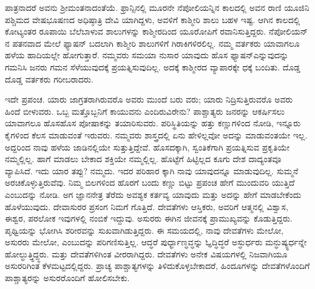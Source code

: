 ಪಾತ್ರನಾದರೆ ಅವನು ಶ‍್ರೀಮಂತನಾದಂತೆಯೆ. ಫ್ರಾನ್ಸಿನಲ್ಲಿ ಮೂರನೇ ನೆಪೋಲಿಯನ್ನಿನ ಕಾಲದಲ್ಲಿ ಅವನ ರಾಣಿ ಯೂಜಿನಿ ಪಶ್ಚಿಮದ ವೇಷಭೂಷಣದ ಅಧಿಷ್ಠಾತ್ರಿ ದೇವಿ ಯಾಗಿದ್ದಳು, ಅವಳಿಗೆ ಕಾಶ್ಮೀರಿ ಶಾಲು ಬಹಳ ಇಷ್ಟ. ಆಗಿನ ಕಾಲದಲ್ಲಿ ಕೋಟ್ಯಂತರ ರೂಪಾಯಿ ಬೆಲೆಬಾಳುವ ಶಾಲುಗಳನ್ನು ಕಾಶ್ಮೀರದಿಂದ ಯೂರೋಪಿಗೆ ರವಾನಿಸುತ್ತಿದ್ದರು. ನೆಪೋಲಿಯನ್​ನ ಪತನವಾದ ಮೇಲೆ ಫ್ಯಾಷನ್​ ಬದಲಾಗಿ ಕಾಶ್ಮೀರಿ ಶಾಲುಗಳಿಗೆ ಗಿರಾಕಿಗಳಿರಲಿಲ್ಲ. ನಮ್ಮ ವರ್ತಕರು ಯಾವಾಗಲೂ ಹಳೆಯ ಹಾದಿಯಲ್ಲೇ ಹೋಗುತ್ತಾರೆ. ನಮ್ಮವರು ಸಮಯಾ ನುಸಾರ ಯಾವುದು ಹೊಸ ಫ್ಯಾಷನ್​ ಎನ್ನುವುದನ್ನು ಗಮನಿಸಿ ಜನರು ಗಮನ ಸೆಳೆಯುವುದಕ್ಕೆ ಪ್ರಯತ್ನಿಸುವುದಿಲ್ಲ. ಅದಕ್ಕೆ ಕಾಶ್ಮೀರದ ವ್ಯಾಪಾರಕ್ಕೇ ಧಕ್ಕೆ ಬಂದಿತು. ದೊಡ್ಡ ದೊಡ್ಡ ವರ್ತಕರು ಗರೀಬರಾದರು.

ಇದೇ ಪ್ರಪಂಚ. ಯಾರು ಜಾಗ್ರತರಾಗಿರುವರೊ ಅವರು ಮುಂದೆ ಬರು ವರು; ಯಾರು ನಿದ್ರಿಸುತ್ತಿರುವರೊ ಅವರು ಹಿಂದೆ ಬೀಳುವರು. ಒಬ್ಬ ಮತ್ತೊಬ್ಬನಿಗೆ ಕಾಯುವನು ಎಂದಿರುವಿರೇನು? ಪಾಶ್ಚಾತ್ಯರು ಜನರನ್ನು ಆಕರ್ಷಿಸಲು ಯಾವಾಗಲೂ ಹೊಸಹೊಸ ಪೋಷಾಕನ್ನು ತಯಾರಿಸುವರು. ಪರಿಸ್ಥಿತಿಯನ್ನು ಹತ್ತು ಕಣ್ಣುಗಳಿಂದ ನೋಡಿ, ಇನ್ನೂರು ಕೈಗಳಿಂದ ಕೆಲಸ ಮಾಡುವಂತೆ ಇರುವರು. ನಮ್ಮವರು ಶಾಸ್ತ್ರದಲ್ಲಿ ಏನು ಹೇಳಿಲ್ಲವೋ ಅದನ್ನು ಮಾಡುವಂತಯೇ ಇಲ್ಲ. ಅದ್ದರಿಂದ ನಾವು ಹಳೆಯ ಜಾಡಿನಲ್ಲಿಯೇ ಸುತ್ತುತ್ತಿದ್ದೇವೆ. ಹೊಸದಕ್ಕಾಗಿ, ಸ್ವಂತಿಕೆಗಾಗಿ ಪ್ರಯತ್ನಿಸುವ ಪ್ರಕೃತಿಯೇ ನಮ್ಮಲ್ಲಿಲ್ಲ. ಹಾಗೆ ಮಾಡಲು ಬೇಕಾದ ಶಕ್ತಿಯೇ ನಮ್ಮಲ್ಲಿಲ್ಲ. ಹೊಟ್ಟೆಗೆ ಹಿಟ್ಟಿಲ್ಲದ ಕೂಗು ದೇಶ ದಾದ್ಯಂತವೂ ವ್ಯಾಪಿಸಿದೆ. ಇದು ಯಾರ ತಪ್ಪು? ನಮ್ಮದು. ಇದರ ಪರಿಹಾರ ಕ್ಕಾಗಿ ನಾವು ಯಾವುದನ್ನೂ ಮಾಡುವುದಿಲ್ಲ. ಸುಮ್ಮನೆ ಅರಚಿಕೊಳ್ಳುತ್ತಿರುವೆವು. ನಿಮ್ಮ ಬಿಲಗಳಿಂದ ಹೊರಗೆ ಬಂದು ಕಣ್ಣು ಬಿಟ್ಟು ಪ್ರಪಂಚ ಹೇಗೆ ಮುಂದುವರಿ ಯುತ್ತಿದೆ ಎಂಬುದನ್ನು ನೋಡಿ. ಅಗ ಜ್ಞಾನನೇತ್ರ ತೆರೆದು ಅವಶ್ಯಕ ಕರ್ತವ್ಯ ಯಾವುದು ಮತ್ತು ಅದನ್ನು ಹೇಗೆ ಮಾಡಬೇಕೆಂದು ಹೊಳೆಯುವುದು. ದೇವಾಸುರರ ಪ್ರಸಂಗ ನಿಮಗೆ ಗೊತ್ತಿದೆ. ದೇವತೆಗಳು ಆಸ್ತಿಕರು, ಅವರಿಗೆ ಆತ್ಮನಲ್ಲಿ ವಿಶ್ವಾಸ, ಈಶ್ವರ, ಪರಲೋಕ ಇವುಗಳಲ್ಲಿ ನಂಬಿಕೆ ಇದ್ದುವು. ಅಸುರರು ಈಗಿನ ಜೀವನಕ್ಕೆ ಪ್ರಾಮುಖ್ಯವನ್ನು ಕೊಡುತ್ತಿದ್ದರು. ಪೃಥ್ವಿಯನ್ನು ಭೋಗಿಸಿ ಶರೀರವನ್ನು ಸುಖವಾಗಿಡುತ್ತಿದ್ದರು. ಈ ಸಮಯದಲ್ಲಿ, ನಾವು ದೇವತೆಗಳು ಮೇಲೋ, ಅಸುರರು ಮೇಲೋ, ಎಂಬುದನ್ನು ಪರಿಗಣಿಸುತ್ತಿಲ್ಲ. ಆದ್ಧರೆ ಪುರ್ಧ್ಧಾಣ್ಧವ್ಧನ್ನು ಓ್ಧದ್ಧಿದ್ಧರೆ ಅಸ್ಧುರ್ಧರು ಮನ್ಧುಷ್ಯ್ಧರ್ಧನ್ನೇ ಹೋಲ್ಧುತ್ತ್ಧಿದ್ದ್ಧರು. ಮತ್ತು ದೇವತೆಗಳಿಗಿಂತ ವೀರರಾಗಿದ್ದರು. ದೇವತೆಗಳು ಅನೇಕ ವಿಷಯಗಳಲ್ಲಿ ನಿಜವಾಗಿಯೂ ಅಸುರರಿಗಿಂತ ಕೆಳಮಟ್ಟದಲ್ಲಿದ್ದರು. ಪ್ರಾಚ್ಯ ಪಾಶ್ಚಾತ್ಯಗಳನ್ನು ತಿಳಿದುಕೊಳ್ಳಬೇಕಾದರೆ, ಹಿಂದೂಗಳನ್ನು ದೇವತೆಗಳೊಂದಿಗೆ ಪಾಶ್ಚಾತ್ಯರನ್ನು ಅಸುರರೊಂದಿಗೆ ಹೋಲಿಸಬೇಕು.

